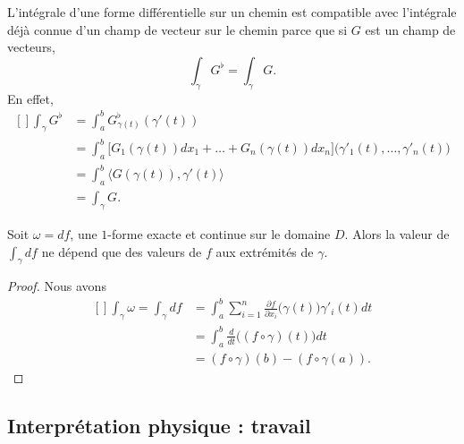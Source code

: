 L'intégrale d'une forme différentielle sur un chemin est compatible avec l'intégrale déjà connue d'un champ de vecteur sur le chemin parce que si \( G\) est un champ de vecteurs,
\begin{equation}
	\int_{\gamma}G^{\flat}=\int_{\gamma}G.
\end{equation}
En effet,
\begin{equation}
	\begin{aligned}[]
		\int_{\gamma} G^{\flat} & =\int_a^b G_{\gamma(t)}^{\flat}(\gamma'(t))                                                                      \\
		                        & =\int_a^b\big[ G_1( \gamma(t) )dx_1+\ldots+ G_n(\gamma(t))dx_n \big]\big( \gamma'_1(t),\ldots,\gamma'_n(t) \big) \\
		                        & =\int_{a}^b\langle G(\gamma(t)), \gamma'(t)\rangle                                                               \\
		                        & =\int_{\gamma}G.
	\end{aligned}
\end{equation}


\begin{proposition}
	Soit \( \omega=df\), une \( 1\)-forme exacte et continue sur le domaine \( D\). Alors la valeur de \( \int_{\gamma}df\) ne dépend que des valeurs de \( f\) aux extrémités de \( \gamma\).
\end{proposition}

\begin{proof}
	Nous avons
	\begin{equation}
		\begin{aligned}[]
			\int_{\gamma}\omega=\int_{\gamma}df & =\int_{a}^b\sum_{i=1}^n\frac{ \partial f }{ \partial x_i }\big( \gamma(t) \big)\gamma'_i(t)dt \\
			                                    & =\int_a^b\frac{ d }{ dt }\Big( (f\circ\gamma)(t) \Big)dt                                      \\
			                                    & =(f\circ\gamma)(b)-(f\circ\gamma(a)).
		\end{aligned}
	\end{equation}
\end{proof}

\subsection{Interprétation physique : travail}


